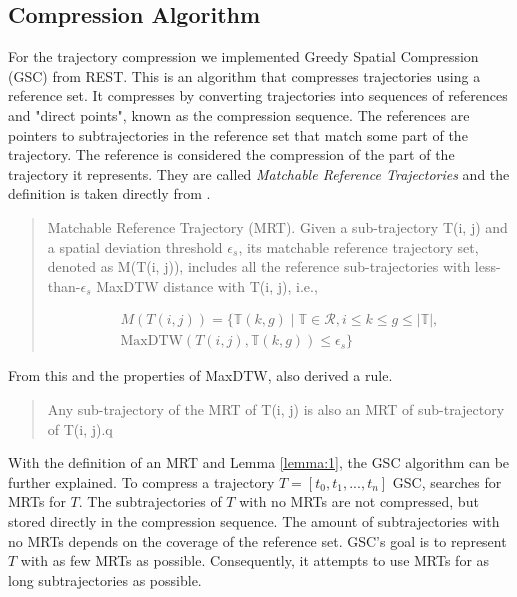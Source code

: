 \subsection{Compression Algorithm}
For the trajectory compression we implemented Greedy Spatial Compression (GSC) from REST. This is an algorithm that compresses trajectories using a reference set. It compresses by converting trajectories into sequences of references and "direct points", known as the compression sequence. The references are pointers to subtrajectories in the reference set that match some part of the trajectory. The reference is considered the compression of the part of the trajectory it represents. They are called \textit{Matchable Reference Trajectories} and the definition is taken directly from \textcite{zhao2018rest}.
\begin{quote}
    \begin{definition}
        \label{def:mrt}
        Matchable Reference Trajectory (MRT). Given a sub-trajectory T(i, j) and a spatial deviation threshold $\epsilon_{s}$, its matchable reference trajectory set, denoted as M(T(i, j)), includes all the reference sub-trajectories with less-than-$\epsilon_{s}$ MaxDTW distance with T(i, j), i.e.,
    \end{definition}
    \begin{equation}\label{eq:mrt}
        \begin{aligned}
            M(T(i,j)) = \{ \mathbb{T}(k,g) \mid \mathbb{T} \in \mathcal{R}, i \leq k \leq g \leq \left\lvert \mathbb{T} \right\rvert, \\
            \text{MaxDTW}(T(i,j), \mathbb{T}(k,g)) \leq \epsilon_{s} \}
        \end{aligned}
    \end{equation}
\end{quote}

From this and the properties of MaxDTW, \textcite{zhao2018rest} also derived a rule.

\begin{quote}
    \begin{lemma}\label{lemma:1}
        Any sub-trajectory of the MRT of T(i, j) is also an MRT of sub-trajectory of T(i, j).q
    \end{lemma}
\end{quote}


With the definition of an MRT and Lemma \ref{lemma:1}, the GSC algorithm can be further explained. To compress a trajectory $T = [t_0, t_1, ..., t_n]$ GSC, searches for MRTs for $T$. The subtrajectories of $T$ with no MRTs are not compressed, but stored directly in the compression sequence. The amount of subtrajectories with no MRTs depends on the coverage of the reference set. GSC's goal is to represent $T$ with as few MRTs as possible. Consequently, it attempts to use MRTs for as long subtrajectories as possible.


